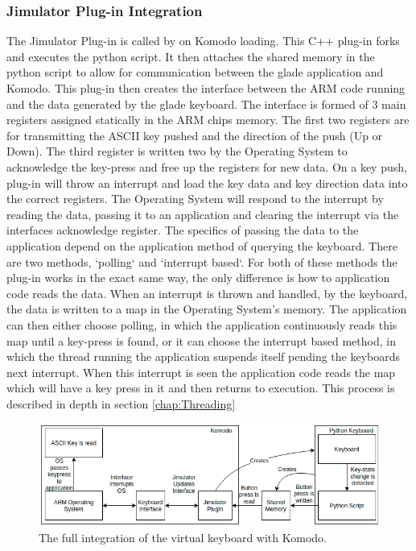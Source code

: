 \subsubsection{Jimulator Plug-in Integration}
The Jimulator Plug-in is called by on Komodo loading. This C++ plug-in \cite{cbook} forks and executes the python script. It then attaches the shared memory in the python script to allow for communication between the glade application and Komodo. This plug-in then creates the interface between the ARM code running and the data generated by the glade keyboard. The interface is formed of 3 main registers assigned statically in the ARM chips memory. The first two registers are for transmitting the ASCII key pushed and the direction of the push (Up or Down). The third register is written two by the Operating System to acknowledge the key-press and free up the registers for new data. On a key push, plug-in will throw an interrupt and load the key data and key direction data into the correct registers. The Operating System will respond to the interrupt by reading the data, passing it to an application and clearing the interrupt via the interfaces acknowledge register. The specifics of passing the data to the application depend on the application method of querying the keyboard. There are two methods, `polling` and `interrupt based`. For both of these methods the plug-in works in the exact same way, the only difference is how to application code reads the data. When an interrupt is thrown and handled, by the keyboard, the data is written to a map in the Operating System's memory. The application can then either choose polling, in which the application continuously reads this map until a key-press is found, or it can choose the interrupt based method, in which the thread running the application suspends itself pending the keyboards next interrupt. When this interrupt is seen the application code reads the map which will have a key press in it and then returns to execution. This process is described in depth in section \ref{chap:Threading}
\begin{figure}[ht!]
	\includegraphics[width=\linewidth]{figures/jimulator.png}
	\caption{The full integration of the virtual keyboard with Komodo.}
	\label{fig:keyboard_integration}
\end{figure} 
